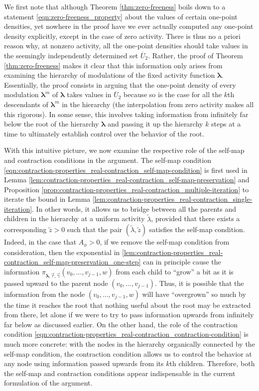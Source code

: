 \documentclass[11pt]{article}
\newcommand{\bl}{\bm{\lambda}}
\newcommand{\tl}{\tilde{\lambda}}
\newcommand{\tz}{\tilde{z}}
\newcommand{\aconst}{A_{\phi}}
\numberwithin{equation}{section}
\theoremstyle{plain}
\theoremstyle{definition}
\theoremstyle{remark}
\begin{document}
We first note that although Theorem \ref{thm:zero-freeness} boils down to a statement \eqref{eqn:zero-freeness_property} about the values of certain one-point densities, yet nowhere in the proof have we ever actually computed any one-point density explicitly, except in the case of zero activity.
There is thus no a priori reason why, at nonzero activity, all the one-point densities should take values in the seemingly independently determined set $\overline{U}_{2}$.
Rather, the proof of Theorem \ref{thm:zero-freeness} makes it clear that this information only arises from examining the hierarchy of modulations of the fixed activity function $\bl$.
Essentially, the proof consists in arguing that the one-point density of every modulation $\bl^{m}$ of $\bl$ takes values in $\overline{U}_{2}$ because so is the case for all the $k$th descendants of $\bl^{m}$ in the hierarchy (the interpolation from zero activity makes all this rigorous).
In some sense, this involves taking information from infinitely far below the root of the hierarchy $\bl$ and passing it up the hierarchy $k$ steps at a time to ultimately establish control over the behavior of the root.

With this intuitive picture, we now examine the respective role of the self-map and contraction conditions in the argument.
The self-map condition \eqref{eqn:contraction-properties_real-contraction_self-map-condition} is first used in Lemma \ref{lem:contraction-properties_real-contraction_self-map-preservation} and Proposition \ref{prop:contraction-properties_real-contraction_multiple-iteration} to iterate the bound in Lemma \ref{lem:contraction-properties_real-contraction_single-iteration}.
In other words, it allows us to bridge between all the parents and children in the hierarchy at a uniform activity $\tl$, provided that there exists a corresponding $\tz>0$ such that the pair $(\tl,\tz)$ satisfies the self-map condition.
Indeed, in the case that $\aconst>0$, if we remove the self-map condition from consideration, then the exponential in \eqref{lem:contraction-properties_real-contraction_self-map-preservation_one-step} can in principle cause the information $\pi_{\bl,\vec{\tau},\vec{\gamma}}(v_{0},\dots,v_{j-1},w)$ from each child to ``grow'' a bit as it is passed upward to the parent node $(v_{0},\dots,v_{j-1})$.
Thus, it is possible that the information from the node $(v_{0},\dots,v_{j-1},w)$ will have ``overgrown'' so much by the time it reaches the root that nothing useful about the root may be extracted from there, let alone if we were to try to pass information upwards from infinitely far below as discussed earlier.
On the other hand, the role of the contraction condition \eqref{eqn:contraction-properties_real-contraction_contraction-condition} is much more concrete: with the nodes in the hierarchy organically connected by the self-map condition, the contraction condition allows us to control the behavior at any node using information passed upwards from its $k$th children. 
Therefore, both the self-map and contraction conditions appear indispensable in the current formulation of the argument.
\end{document}
